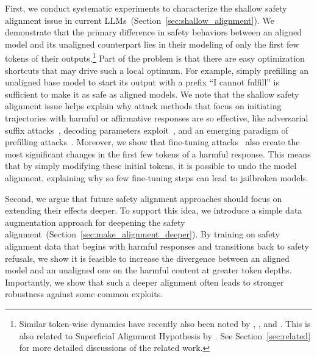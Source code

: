 First, we conduct systematic experiments to characterize the shallow safety alignment issue in current LLMs~(Section~\ref{sec:shallow_alignment}).
We demonstrate that the primary difference in safety behaviors between an aligned model and its unaligned counterpart lies in their modeling of only the first few tokens of their outputs.\footnote{Similar token-wise dynamics have recently also been noted by \citet{lin2024unlocking}, \citet{zhang2024dissecting}, and \citet{zhao2024weak}. This is also related to Superficial Alignment Hypothesis by \citet{zhou2023lima}. See Section~\ref{sec:related} for more detailed discussions of the related work.}
Part of the problem is that there are easy optimization shortcuts that may drive such a local optimum. 
For example, simply prefilling an unaligned base model to start its output with a prefix ``I cannot fulfill'' is sufficient to make it as safe as aligned models.
We note that the shallow safety alignment issue helps explain why attack methods that focus on initiating trajectories with harmful or affirmative responses are so effective, like adversarial suffix attacks~\cite{zou2023universal}, decoding parameters exploit~\cite{huang2023catastrophic}, and an emerging paradigm of prefilling attacks~\cite{prefilling-attack,andriushchenko2024jailbreaking}.
Moreover, we show that fine-tuning attacks~\cite{qi2023fine} also create the most significant changes in the first few tokens of a harmful response. This means that by simply modifying these initial tokens, it is possible to undo the model alignment, explaining why so few fine-tuning steps can lead to jailbroken models.


Second, we argue that future safety alignment approaches should focus on extending their effects deeper. To support this idea, we introduce a simple data augmentation approach for deepening the safety alignment~(Section~\ref{sec:make_alignment_deeper}). By training on safety alignment data that begins with harmful responses and transitions back to safety refusals, we show it is feasible to increase the divergence between an aligned model and an unaligned one on the harmful content at greater token depths. Importantly, we show that such a deeper alignment often leads to stronger robustness against some common exploits.

